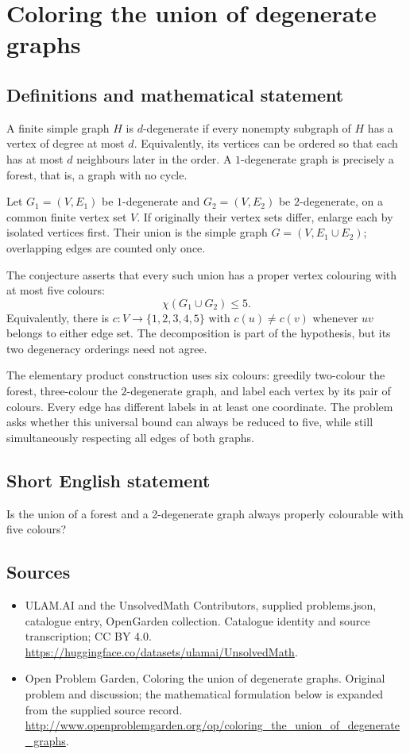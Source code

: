 \documentclass[11pt,a4paper]{article}
\begin{document}
\section*{Coloring the union of degenerate graphs}\label{statement}

\subsection{Definitions and mathematical statement}
A finite simple graph $H$ is $d$-degenerate if every
nonempty subgraph of $H$ has a vertex of degree at
most $d$. Equivalently, its vertices can be ordered
so that each has at most $d$ neighbours later in
the order. A $1$-degenerate graph is precisely a
forest, that is, a graph with no cycle.

Let $G_1=(V,E_1)$ be $1$-degenerate and
$G_2=(V,E_2)$ be $2$-degenerate, on a common finite
vertex set $V$. If originally their vertex sets
differ, enlarge each by isolated vertices first.
Their union is the simple graph
$G=(V,E_1\cup E_2)$; overlapping edges are counted
only once.

The conjecture asserts that every such union has
a proper vertex colouring with at most five colours:
\[
 \chi(G_1\cup G_2)\leq5.
\]
Equivalently, there is $c:V\to\{1,2,3,4,5\}$
with $c(u)\neq c(v)$ whenever $uv$ belongs to
either edge set. The decomposition is part of
the hypothesis, but its two degeneracy orderings
need not agree.

The elementary product construction uses six
colours: greedily two-colour the forest, three-colour
the $2$-degenerate graph, and label each vertex
by its pair of colours. Every edge has different
labels in at least one coordinate. The problem
asks whether this universal bound can always be
reduced to five, while still simultaneously
respecting all edges of both graphs.
\subsection{Short English statement}
Is the union of a forest and a 2-degenerate graph always properly colourable with five colours?
\subsection{Sources}
\begin{itemize}
\item[S1] ULAM.AI and the UnsolvedMath Contributors, supplied problems.json, catalogue entry, OpenGarden collection. Catalogue identity and source transcription; CC BY 4.0.
\url{https://huggingface.co/datasets/ulamai/UnsolvedMath}.
\item[S2] Open Problem Garden, Coloring the union of degenerate graphs. Original problem and discussion; the mathematical formulation below is expanded from the supplied source record.
\url{http://www.openproblemgarden.org/op/coloring_the_union_of_degenerate_graphs}.
\end{itemize}
\end{document}

